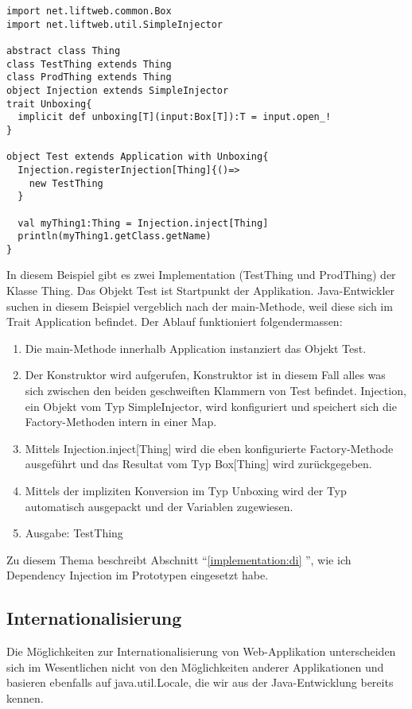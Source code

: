 \begin{lstlisting}[caption=Dependency Injection mit dem Lift Framework - ein Beispiel]
import net.liftweb.common.Box
import net.liftweb.util.SimpleInjector

abstract class Thing
class TestThing extends Thing
class ProdThing extends Thing
object Injection extends SimpleInjector
trait Unboxing{
  implicit def unboxing[T](input:Box[T]):T = input.open_!
}

object Test extends Application with Unboxing{
  Injection.registerInjection[Thing]{()=>
    new TestThing
  }

  val myThing1:Thing = Injection.inject[Thing]
  println(myThing1.getClass.getName)
}\end{lstlisting}
In diesem Beispiel gibt es zwei Implementation (TestThing und ProdThing) der Klasse Thing. Das Objekt Test ist Startpunkt der Applikation. Java-Entwickler suchen in diesem Beispiel vergeblich nach der main-Methode, weil diese sich im Trait Application befindet. Der Ablauf  funktioniert folgendermassen:
\begin{enumerate}
\item Die main-Methode innerhalb Application instanziert das Objekt Test.
\item Der Konstruktor wird aufgerufen, Konstruktor ist in diesem Fall alles was sich zwischen den beiden geschweiften Klammern von Test befindet. Injection, ein Objekt vom Typ SimpleInjector, wird konfiguriert und speichert sich die Factory-Methoden intern in einer Map.
\item Mittels Injection.inject[Thing] wird die eben konfigurierte Factory-Methode ausgef\"uhrt und das Resultat vom Typ Box[Thing] wird zur\"uckgegeben.
\item Mittels der impliziten Konversion im Typ Unboxing wird der Typ automatisch ausgepackt und der Variablen zugewiesen.
\item Ausgabe: TestThing
\end{enumerate}

Zu diesem Thema beschreibt Abschnitt ``\ref{implementation:di} '', wie ich Dependency Injection im Prototypen eingesetzt habe.

\subsection{Internationalisierung}\label{lift:internationalisierung}
Die M\"oglichkeiten zur Internationalisierung von Web-Applikation unterscheiden sich im Wesentlichen nicht von den M\"oglichkeiten anderer Applikationen und basieren ebenfalls auf java.util.Locale, die wir aus der Java-Entwicklung bereits kennen. 

